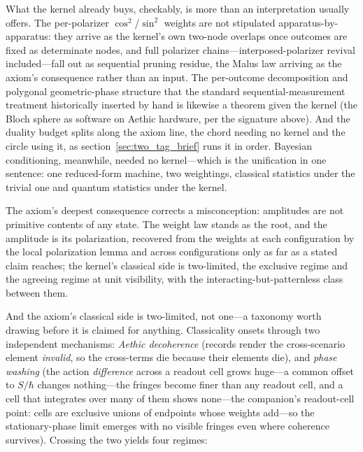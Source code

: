 \documentclass[11pt]{article}
\theoremstyle{definition}
\begin{document}
What the kernel already buys, checkably, is more than an interpretation usually offers. The per-polarizer $\cos^2$/$\sin^2$ weights are not stipulated apparatus-by-apparatus: they arrive as the kernel's own two-node overlaps once outcomes are fixed as determinate nodes, and full polarizer chains---interposed-polarizer revival included---fall out as sequential pruning residue, the Malus law arriving as the axiom's consequence rather than an input. The per-outcome decomposition and polygonal geometric-phase structure that the standard sequential-measurement treatment historically inserted by hand is likewise a theorem given the kernel (the Bloch sphere as software on Aethic hardware, per the signature above). And the duality budget splits along the axiom line, the chord needing no kernel and the circle using it, as section~\ref{sec:two_tag_brief} runs it in order. Bayesian conditioning, meanwhile, needed no kernel---which is the unification in one sentence: one reduced-form machine, two weightings, classical statistics under the trivial one and quantum statistics under the kernel.



The axiom's deepest consequence corrects a misconception: amplitudes are not primitive contents of any state. The weight law stands as the root, and the amplitude is its polarization, recovered from the weights at each configuration by the local polarization lemma and across configurations only as far as a stated claim reaches; the kernel's classical side is two-limited, the exclusive regime and the agreeing regime at unit visibility, with the interacting-but-patternless class between them.



And the axiom's classical side is two-limited, not one---a taxonomy worth drawing before it is claimed for anything. Classicality onsets through two independent mechanisms: \emph{Aethic decoherence} (records render the cross-scenario element \emph{invalid}, so the cross-terms die because their elements die), and \emph{phase washing} (the action \emph{difference} across a readout cell grows huge---a common offset to $S/\hbar$ changes nothing---the fringes become finer than any readout cell, and a cell that integrates over many of them shows none---the companion's readout-cell point: cells are exclusive unions of endpoints whose weights add---so the stationary-phase limit \cite{dirac1933lagrangian, feynman1948space} emerges with no visible fringes even where coherence survives). Crossing the two yields four regimes:
\end{document}
